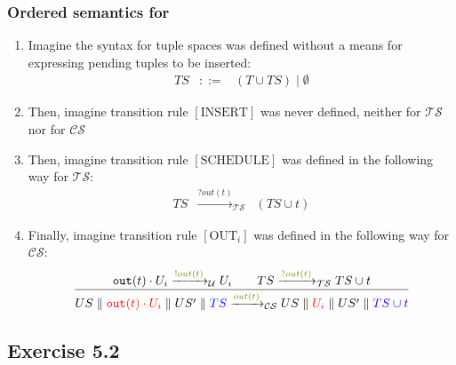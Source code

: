 \documentclass[handout]{beamer}\mode<presentation>{\usetheme{AMSCesenaBleu}}
\begin{document}
\begin{frame}
\frametitle{Ordered semantics for \linda{}}

    \begin{enumerate}
        \item<1> Imagine the syntax for tuple spaces was defined without a means for expressing pending tuples to be inserted:
        \[\begin{array}{rcl}
            TS &::=& (T \cup TS) \mid \emptyset
        \end{array}\]
        
        \vfill
        
        \item<2> Then, imagine transition rule $[\text{INSERT}]$ was never defined, neither for $\mathcal{TS}$ nor for $\mathcal{CS}$
        
        \vfill
        
        \item<3> Then, imagine transition rule $[\text{SCHEDULE}]$ was defined in the following way for $\mathcal{TS}$:
        \[\begin{array}{rcl}
            TS &\xrightarrow{?out(t)}_\mathcal{TS}& (TS \cup t)
        \end{array}\]
        
        \vfill
        
        \item<4> Finally, imagine transition rule $[\text{OUT}_i]$ was defined in the following way for $\mathcal{CS}$:
        \[
            \frac{
                \mathtt{out}(t) \cdot U_i \xrightarrow{\highlightG{!out(t)}}_\mathcal{U} U_i 
                \qquad
                TS \xrightarrow{\highlightG{?out(t)}}_\mathcal{TS} TS \cup t 
            }{
                US \parallel \highlightR{\mathtt{out}(t) \cdot U_i} \parallel US' \parallel \highlightB{TS}
                \xrightarrow{\highlightG{out(t)}}_\mathcal{CS}
                US \parallel \highlightR{U_i} \parallel US' \parallel \highlightB{TS \cup t }
            }
        \]
    \end{enumerate}

\end{frame}

\subsection{Exercise 5.2}
\end{document}

